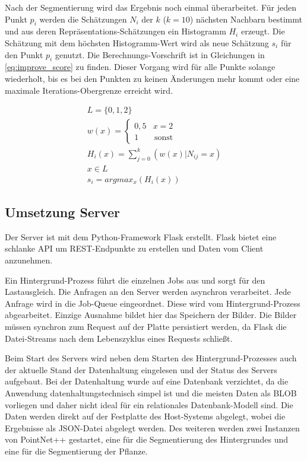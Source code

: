 \documentclass[12pt,titlepage, twoside]{article}
\begin{document}
Nach der Segmentierung wird das Ergebnis noch einmal überarbeitet. 
Für jeden Punkt $p_i$ werden die Schätzungen $N_i$ der $k$ ($k=10$) nächsten Nachbarn bestimmt und aus deren Repräsentations-Schätzungen ein Histogramm $H_i$ erzeugt.
Die Schätzung mit dem höchsten Histogramm-Wert wird als neue Schätzung $s_i$ für den Punkt $p_i$ genutzt. Die Berechnungs-Vorschrift ist in Gleichungen in \ref{eq:improve_score} zu finden. 
Dieser Vorgang wird für alle Punkte solange wiederholt, bis es bei den Punkten zu keinen Änderungen mehr kommt oder eine maximale Iterations-Obergrenze erreicht wird.

\begin{equation}
\label{eq:improve_score}
\begin{array}{l}
L =  \{0,1,2\}\\
w(x) = \left\{
\begin{array}{ll}
0,5 & x = 2 \\
1 & \, \textrm{sonst} 
\end{array}
\right.\\ 
H_i(x) = \sum_{j=0}^{k}{(w(x) | N_{ij} = x)}\\
x \in L\\
s_i = argmax_x(H_i(x))
\end{array}
\end{equation}

\subsection{Umsetzung Server}
\label{sec:realisierung:implementierung4}

Der Server ist mit dem Python-Framework Flask erstellt. Flask bietet eine schlanke API um REST-Endpunkte zu erstellen und Daten vom Client anzunehmen. 

Ein Hintergrund-Prozess führt die einzelnen Jobs aus und sorgt für den Lastausgleich. Die Anfragen an den Server werden asynchron verarbeitet. 
Jede Anfrage wird in die Job-Queue eingeordnet. Diese wird vom Hintergrund-Prozess abgearbeitet.
Einzige Ausnahme bildet hier das Speichern der Bilder. Die Bilder müssen synchron zum Request auf der Platte persistiert werden, da Flask die Datei-Streams nach dem Lebenszyklus eines Requests schließt.

Beim Start des Servers wird neben dem Starten des Hintergrund-Prozesses auch der aktuelle Stand der Datenhaltung eingelesen und der Status des Servers aufgebaut. 
Bei der Datenhaltung wurde auf eine Datenbank verzichtet, da die Anwendung datenhaltungstechnisch simpel ist und die meisten Daten als BLOB \cite{sears2007blob} vorliegen und daher nicht ideal für ein relationales Datenbank-Modell sind. 
Die Daten werden direkt auf der Festplatte des Host-Systems abgelegt, wobei die Ergebnisse als JSON-Datei abgelegt werden.
Des weiteren werden zwei Instanzen von PointNet++ gestartet, eine für die Segmentierung des Hintergrundes und eine für die Segmentierung der Pflanze.
\end{document}
